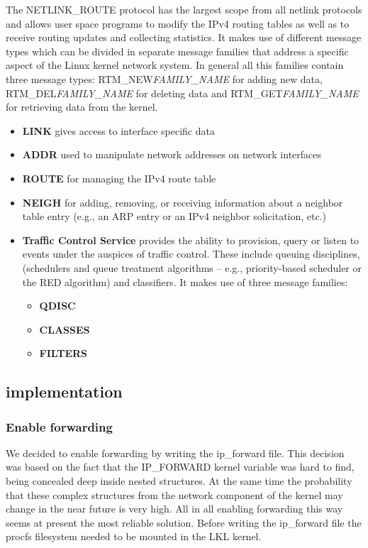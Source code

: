 {{The NETLINK_ROUTE protocol has the largest scope from all netlink protocols and allows user space programs 
to modify the IPv4 routing tables as well as to receive routing updates and collecting statistics. It makes use of 
different message types which can be divided in separate message families that address a specific aspect of the 
Linux kernel network system. In general all this families contain three message types: RTM_NEW\textit{FAMILY_NAME} 
for adding new data, RTM_DEL\textit{FAMILY_NAME} for deleting data and RTM_GET\textit{FAMILY_NAME} for retrieving data from the kernel.
\begin{itemize}
\item{\bf LINK} gives access to interface specific data
\item{\bf ADDR} used to manipulate network addresses on network interfaces
\item{\bf ROUTE} for managing the IPv4 route table
\item{\bf NEIGH} for adding, removing, or receiving information about a neighbor table entry (e.g., an ARP entry or an IPv4 neighbor solicitation, etc.)
\item \textbf{Traffic Control Service} provides the ability to provision, query or listen to
   events under the auspices of traffic control.  These include queuing
   disciplines, (schedulers and queue treatment algorithms -- e.g.,
   priority-based scheduler or the RED algorithm) and classifiers. It makes use of three message families:
\begin{itemize} 
\item{\bf QDISC}
\item{\bf CLASSES}
\item{\bf FILTERS}
\end{itemize}
\end{itemize} 

\subsection{\project implementation}
\label{sub-sec:router-lklnet}
\subsubsection{Enable forwarding}
We decided to enable forwarding by writing the ip_forward file. This decision was based on the fact that the 
IP_FORWARD kernel variable was hard to find, being concealed deep inside nested structures. At the same time 
the probability that these complex structures from the network component of the kernel may change in the near 
future is very high. All in all enabling forwarding this way seems at present the most reliable solution.
Before writing the ip_forward file the procfs filesystem needed to be mounted in the LKL kernel. 

}}
